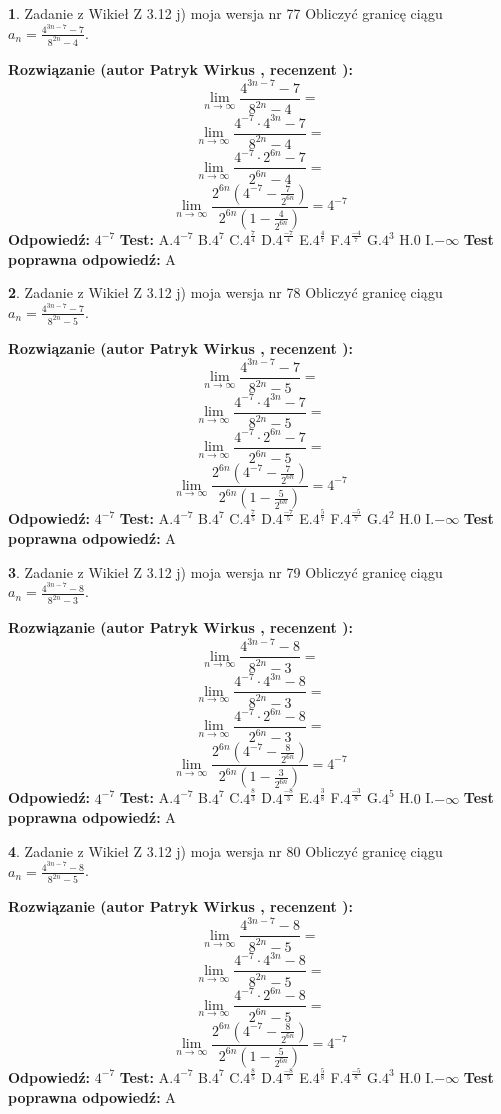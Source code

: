 \documentclass[12pt, a4paper]{article}
\theoremstyle{definition} %
\newtheorem{zad}{}
\newcommand{\zadStart}[1]{\begin{zad}#1\newline}
\newcommand{\zadStop}{\end{zad}}
\newcommand{\rozwStart}[2]{\noindent \textbf{Rozwiązanie (autor #1 , recenzent #2): }\newline}
\newcommand{\rozwStop}{\newline}
\newcommand{\odpStart}{\noindent \textbf{Odpowiedź:}\newline}
\newcommand{\odpStop}{\newline}
\newcommand{\testStart}{\noindent \textbf{Test:}\newline}
\newcommand{\testStop}{\newline}
\newcommand{\kluczStart}{\noindent \textbf{Test poprawna odpowiedź:}\newline}
\newcommand{\kluczStop}{\newline}
\begin{document}
\zadStart{Zadanie z Wikieł Z 3.12 j) moja wersja nr 77}
Obliczyć granicę ciągu $a_{n}=\frac{4^{3n-7}-7}{8^{2n}-4}$.
\zadStop
\rozwStart{Patryk Wirkus}{}
$$\lim\limits_{n\to\infty}\frac{4^{3n-7}-7}{8^{2n}-4}=$$
$$\lim\limits_{n\to\infty}\frac{4^{-7} \cdot 4^{3n}-7}{8^{2n}-4}=$$
$$\lim\limits_{n\to\infty}\frac{4^{-7} \cdot 2^{6n}-7}{2^{6n}-4}=$$
$$\lim\limits_{n\to\infty}\frac{2^{6n}(4^{-7} - \frac{7}{2^{6n}})}{2^{6n}(1-\frac{4}{2^{6n}})}= 4^{-7}$$
\rozwStop
\odpStart
$4^{-7}$
\odpStop
\testStart
A.$4^{-7}$
B.$4^{7}$
C.$4^{\frac{7}{4}}$
D.$4^{\frac{-7}{4}}$
E.$4^{\frac{4}{7}}$
F.$4^{\frac{-4}{7}}$
G.$4^{3}$
H.$0$
I.$-\infty$
\testStop
\kluczStart
A
\kluczStop



\zadStart{Zadanie z Wikieł Z 3.12 j) moja wersja nr 78}
Obliczyć granicę ciągu $a_{n}=\frac{4^{3n-7}-7}{8^{2n}-5}$.
\zadStop
\rozwStart{Patryk Wirkus}{}
$$\lim\limits_{n\to\infty}\frac{4^{3n-7}-7}{8^{2n}-5}=$$
$$\lim\limits_{n\to\infty}\frac{4^{-7} \cdot 4^{3n}-7}{8^{2n}-5}=$$
$$\lim\limits_{n\to\infty}\frac{4^{-7} \cdot 2^{6n}-7}{2^{6n}-5}=$$
$$\lim\limits_{n\to\infty}\frac{2^{6n}(4^{-7} - \frac{7}{2^{6n}})}{2^{6n}(1-\frac{5}{2^{6n}})}= 4^{-7}$$
\rozwStop
\odpStart
$4^{-7}$
\odpStop
\testStart
A.$4^{-7}$
B.$4^{7}$
C.$4^{\frac{7}{5}}$
D.$4^{\frac{-7}{5}}$
E.$4^{\frac{5}{7}}$
F.$4^{\frac{-5}{7}}$
G.$4^{2}$
H.$0$
I.$-\infty$
\testStop
\kluczStart
A
\kluczStop



\zadStart{Zadanie z Wikieł Z 3.12 j) moja wersja nr 79}
Obliczyć granicę ciągu $a_{n}=\frac{4^{3n-7}-8}{8^{2n}-3}$.
\zadStop
\rozwStart{Patryk Wirkus}{}
$$\lim\limits_{n\to\infty}\frac{4^{3n-7}-8}{8^{2n}-3}=$$
$$\lim\limits_{n\to\infty}\frac{4^{-7} \cdot 4^{3n}-8}{8^{2n}-3}=$$
$$\lim\limits_{n\to\infty}\frac{4^{-7} \cdot 2^{6n}-8}{2^{6n}-3}=$$
$$\lim\limits_{n\to\infty}\frac{2^{6n}(4^{-7} - \frac{8}{2^{6n}})}{2^{6n}(1-\frac{3}{2^{6n}})}= 4^{-7}$$
\rozwStop
\odpStart
$4^{-7}$
\odpStop
\testStart
A.$4^{-7}$
B.$4^{7}$
C.$4^{\frac{8}{3}}$
D.$4^{\frac{-8}{3}}$
E.$4^{\frac{3}{8}}$
F.$4^{\frac{-3}{8}}$
G.$4^{5}$
H.$0$
I.$-\infty$
\testStop
\kluczStart
A
\kluczStop



\zadStart{Zadanie z Wikieł Z 3.12 j) moja wersja nr 80}
Obliczyć granicę ciągu $a_{n}=\frac{4^{3n-7}-8}{8^{2n}-5}$.
\zadStop
\rozwStart{Patryk Wirkus}{}
$$\lim\limits_{n\to\infty}\frac{4^{3n-7}-8}{8^{2n}-5}=$$
$$\lim\limits_{n\to\infty}\frac{4^{-7} \cdot 4^{3n}-8}{8^{2n}-5}=$$
$$\lim\limits_{n\to\infty}\frac{4^{-7} \cdot 2^{6n}-8}{2^{6n}-5}=$$
$$\lim\limits_{n\to\infty}\frac{2^{6n}(4^{-7} - \frac{8}{2^{6n}})}{2^{6n}(1-\frac{5}{2^{6n}})}= 4^{-7}$$
\rozwStop
\odpStart
$4^{-7}$
\odpStop
\testStart
A.$4^{-7}$
B.$4^{7}$
C.$4^{\frac{8}{5}}$
D.$4^{\frac{-8}{5}}$
E.$4^{\frac{5}{8}}$
F.$4^{\frac{-5}{8}}$
G.$4^{3}$
H.$0$
I.$-\infty$
\testStop
\kluczStart
A
\kluczStop
\end{document}
